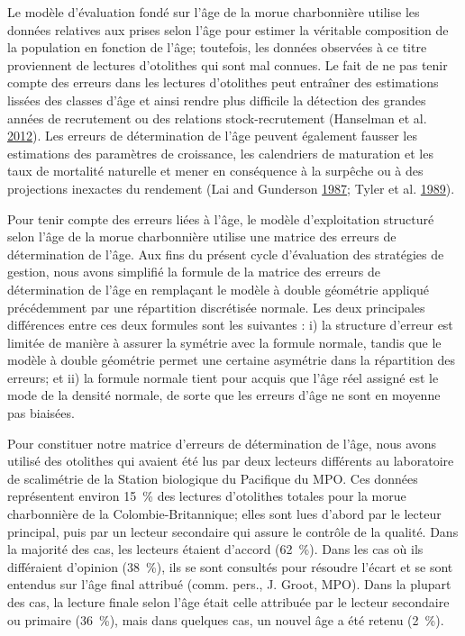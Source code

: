 \documentclass[11pt]{book}
\begin{document}
Le modèle d'évaluation fondé sur l'âge de la morue charbonnière utilise les données relatives aux prises selon l'âge pour estimer la véritable composition de la population en fonction de l'âge; toutefois, les données observées à ce titre proviennent de lectures d'otolithes qui sont mal connues. Le fait de ne pas tenir compte des erreurs dans les lectures d'otolithes peut entraîner des estimations lissées des classes d'âge et ainsi rendre plus difficile la détection des grandes années de recrutement ou des relations stock-recrutement (Hanselman et al. \protect\hyperlink{ref-hanselman2012statistical}{2012}). Les erreurs de détermination de l'âge peuvent également fausser les estimations des paramètres de croissance, les calendriers de maturation et les taux de mortalité naturelle et mener en conséquence à la surpêche ou à des projections inexactes du rendement (Lai and Gunderson \protect\hyperlink{ref-lai1987effects}{1987}; Tyler et al. \protect\hyperlink{ref-tyler1989implications}{1989}).

Pour tenir compte des erreurs liées à l'âge, le modèle d'exploitation structuré selon l'âge de la morue charbonnière utilise une matrice des erreurs de détermination de l'âge. Aux fins du présent cycle d'évaluation des stratégies de gestion, nous avons simplifié la formule de la matrice des erreurs de détermination de l'âge en remplaçant le modèle à double géométrie appliqué précédemment par une répartition discrétisée normale. Les deux principales différences entre ces deux formules sont les suivantes : i) la structure d'erreur est limitée de manière à assurer la symétrie avec la formule normale, tandis que le modèle à double géométrie permet une certaine asymétrie dans la répartition des erreurs; et ii) la formule normale tient pour acquis que l'âge réel assigné est le mode de la densité normale, de sorte que les erreurs d'âge ne sont en moyenne pas biaisées.

Pour constituer notre matrice d'erreurs de détermination de l'âge, nous avons utilisé des otolithes qui avaient été lus par deux lecteurs différents au laboratoire de scalimétrie de la Station biologique du Pacifique du MPO. Ces données représentent environ 15~\% des lectures d'otolithes totales pour la morue charbonnière de la Colombie-Britannique; elles sont lues d'abord par le lecteur principal, puis par un lecteur secondaire qui assure le contrôle de la qualité. Dans la majorité des cas, les lecteurs étaient d'accord (62~\%). Dans les cas où ils différaient d'opinion (38~\%), ils se sont consultés pour résoudre l'écart et se sont entendus sur l'âge final attribué (comm. pers., J. Groot, MPO). Dans la plupart des cas, la lecture finale selon l'âge était celle attribuée par le lecteur secondaire ou primaire (36~\%), mais dans quelques cas, un nouvel âge a été retenu (2~\%).
\end{document}

